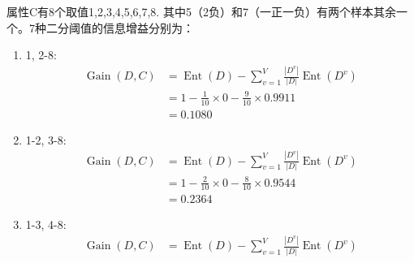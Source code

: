 \documentclass[UTF8,a4paper,AutoFakeBold,AutoFakeSlant]{article}
\begin{document}
\subsubsection{}
属性C有8个取值1,2,3,4,5,6,7,8. 其中5（2负）和7（一正一负）有两个样本其余一个。7种二分阈值的信息增益分别为：
\begin{enumerate}
  \item 1, 2-8:
        \begin{equation*}
          \begin{aligned}
            \operatorname{Gain}(D,C) & = \operatorname{Ent}(D)-\sum_{v=1}^{V} \frac{\left|D^{v}\right|}{|D|} \operatorname{Ent}\left(D^{v}\right) \\
                                     & = 1 - \frac{1}{10}\times 0 - \frac{9}{10}\times 0.9911                                                     \\
                                     & = 0.1080
          \end{aligned}
        \end{equation*}
  \item 1-2, 3-8:
        \begin{equation*}
          \begin{aligned}
            \operatorname{Gain}(D,C) & = \operatorname{Ent}(D)-\sum_{v=1}^{V} \frac{\left|D^{v}\right|}{|D|} \operatorname{Ent}\left(D^{v}\right) \\
                                     & = 1 - \frac{2}{10}\times 0 - \frac{8}{10}\times 0.9544                                                     \\
                                     & = 0.2364
          \end{aligned}
        \end{equation*}
  \item 1-3, 4-8:
        \begin{equation*}
          \begin{aligned}
            \operatorname{Gain}(D,C) & = \operatorname{Ent}(D)-\sum_{v=1}^{V} \frac{\left|D^{v}\right|}{|D|} \operatorname{Ent}\left(D^{v}\right) \\

\end{aligned}
\end{equation*}
\end{enumerate}
\end{document}
